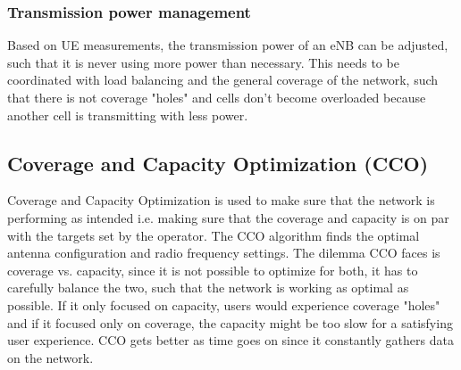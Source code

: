 \documentclass{report}
\begin{document}
\subsubsection{Transmission power management}
Based on UE measurements, the transmission power of an eNB can be adjusted, such that it is never using more power than necessary. This needs to be coordinated with load balancing and the general coverage of the network, such that there is not coverage "holes" and cells don't become overloaded because another cell is transmitting with less power. \cite{Feng2008}

\subsection{Coverage and Capacity Optimization (CCO)}
Coverage and Capacity Optimization is used to make sure that the network is performing as intended i.e. making sure that the coverage and capacity is on par with the targets set by the operator. The CCO algorithm finds the optimal antenna configuration and radio frequency settings.
The dilemma CCO faces is coverage vs. capacity, since it is not possible to optimize for both, it has to carefully balance the two, such that the network is working as optimal as possible. If it only focused on capacity, users would experience coverage "holes" and if it focused only on coverage, the capacity might be too slow for a satisfying user experience. 
CCO gets better as time goes on since it constantly gathers data on the network. \cite{Atayero2014}
\end{document}
